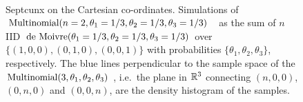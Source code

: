 \begin{figure}[htpb]
\caption{Septcunx on the Cartesian co-ordinates.  Simulations of $\mbox{{\rm Multinomial}}(n=2,\theta_1=1/3,\theta_2=1/3,\theta_3=1/3)$ \rv~as the sum of $n$ IID $\mbox{{\rm de~Moivre}}(\theta_1=1/3,\theta_2=1/3,\theta_3=1/3)$  over $\{(1,0,0),(0,1,0),(0,0,1)\}$ with probabilities $\{\theta_1,\theta_2,\theta_3\}$, respectively.  The blue lines perpendicular to the sample space of the $\mbox{{\rm Multinomial}}(3,\theta_1,\theta_2,\theta_3)$ \rv, i.e.~the plane in $\mathbb{R}^3$ connecting $(n,0,0)$, $(0,n,0)$ and $(0,0,n)$, are the density histogram of the samples.\label{F:MultinomSeptcunxn2n10r1000}}
\centering
\mbox{ \hspace{-2cm}
	    }
\end{figure}

